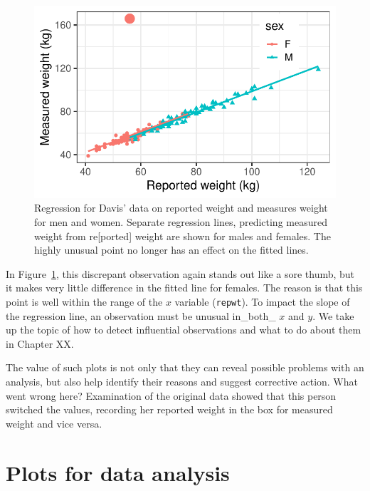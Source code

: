 \documentclass[
  letterpaper,
  10pt,
  krantz2]{krantz}
\begin{document}
\begin{figure}[H]

{\centering \includegraphics{figs/ch02/fig-ch02-davis-reg2-1.pdf}

}

\caption{\label{fig-ch02-davis-reg2}Regression for Davis' data on
reported weight and measures weight for men and women. Separate
regression lines, predicting measured weight from re{[}ported{]} weight
are shown for males and females. The highly unusual point no longer has
an effect on the fitted lines.}

\end{figure}

In Figure~\ref{fig-ch02-davis-reg2}, this discrepant observation again
stands out like a sore thumb, but it makes very little difference in the
fitted line for females. The reason is that this point is well within
the range of the \(x\) variable (\texttt{repwt}). To impact the slope of
the regression line, an observation must be unusual in\_both\_ \(x\) and
\(y\). We take up the topic of how to detect influential observations
and what to do about them in Chapter XX.

The value of such plots is not only that they can reveal possible
problems with an analysis, but also help identify their reasons and
suggest corrective action. What went wrong here? Examination of the
original data showed that this person switched the values, recording her
reported weight in the box for measured weight and vice versa.

\hypertarget{plots-for-data-analysis}{%
\section{Plots for data analysis}\label{plots-for-data-analysis}}
\end{document}
